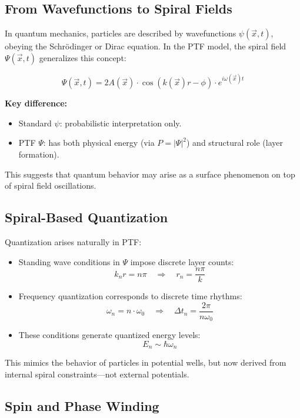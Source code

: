 \documentclass[a4paper,12pt]{article}
\begin{document}
\subsection{From Wavefunctions to Spiral Fields}

In quantum mechanics, particles are described by wavefunctions \(\psi(\vec{x}, t)\), obeying the Schrödinger or Dirac equation.  
In the PTF model, the spiral field \(\Psi(\vec{x}, t)\) generalizes this concept:

\[
\Psi(\vec{x}, t) = 2A(\vec{x}) \cdot \cos(k(\vec{x}) r - \phi) \cdot e^{i\omega(\vec{x}) t}
\]

\textbf{Key difference:}
\begin{itemize}
    \item Standard \(\psi\): probabilistic interpretation only.
    \item PTF \(\Psi\): has both physical energy (via \(P = |\Psi|^2\)) and structural role (layer formation).
\end{itemize}

This suggests that quantum behavior may arise as a surface phenomenon on top of spiral field oscillations.

\subsection{Spiral-Based Quantization}

Quantization arises naturally in PTF:
\begin{itemize}
    \item Standing wave conditions in \(\Psi\) impose discrete layer counts:
    \[
    k_n r = n\pi \quad \Rightarrow \quad r_n = \frac{n\pi}{k}
    \]
    \item Frequency quantization corresponds to discrete time rhythms:
    \[
    \omega_n = n \cdot \omega_0 \quad \Rightarrow \quad \Delta t_n = \frac{2\pi}{n\omega_0}
    \]
    \item These conditions generate quantized energy levels:
    \[
    E_n \sim \hbar \omega_n
    \]
\end{itemize}

This mimics the behavior of particles in potential wells, but now derived from internal spiral constraints—not external potentials.

\subsection{Spin and Phase Winding}
\end{document}
